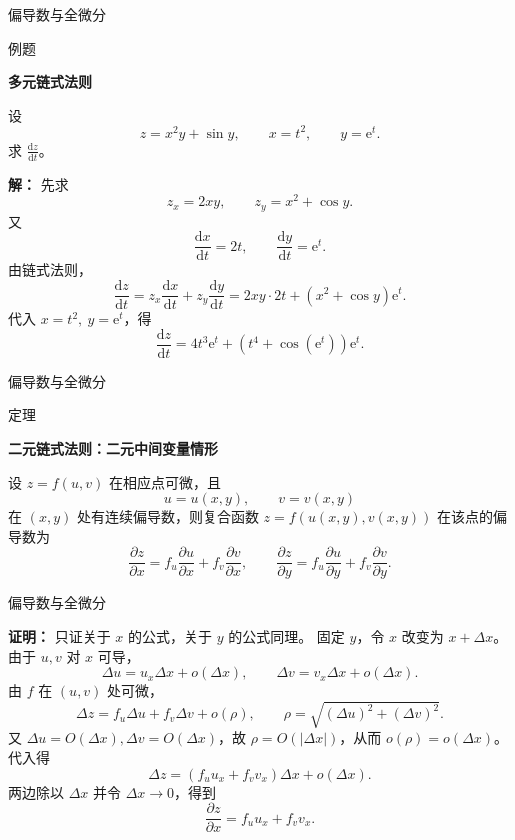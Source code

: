 \documentclass[aspectratio=169,10pt,fontset=fandol]{ctexbeamer}
\newcommand{\dd}{\mathrm{d}}
\newcommand{\ee}{\mathrm{e}}
\begin{document}
\begin{frame}[t,fragile]{偏导数与全微分}
\small
\begin{block}{例题}
{\small
\textbf{多元链式法则}\par

设
\[
z=x^2y+\sin y,\qquad x=t^2,\qquad y=\ee^t.
\]
求 $\frac{\dd z}{\dd t}$。

}
\end{block}
\pause
{\small
\textbf{解：}
先求
\[
z_x=2xy,\qquad z_y=x^2+\cos y.
\]
又
\[
\frac{\dd x}{\dd t}=2t,\qquad \frac{\dd y}{\dd t}=\ee^t.
\]
由链式法则，
\[
\frac{\dd z}{\dd t}
=z_x\frac{\dd x}{\dd t}+z_y\frac{\dd y}{\dd t}
=2xy\cdot2t+(x^2+\cos y)\ee^t.
\]
代入 $x=t^2,\ y=\ee^t$，得
\[
\frac{\dd z}{\dd t}
=4t^3\ee^t+(t^4+\cos(\ee^t))\ee^t.
\]

}
\end{frame}
\begin{frame}[t,fragile]{偏导数与全微分}
\footnotesize
\begin{block}{定理}
{\footnotesize
\textbf{二元链式法则：二元中间变量情形}\par

设 $z=f(u,v)$ 在相应点可微，且
\[
u=u(x,y),\qquad v=v(x,y)
\]
在 $(x,y)$ 处有连续偏导数，则复合函数 $z=f(u(x,y),v(x,y))$ 在该点的偏导数为
\[
\frac{\partial z}{\partial x}=f_u\frac{\partial u}{\partial x}+f_v\frac{\partial v}{\partial x},
\qquad
\frac{\partial z}{\partial y}=f_u\frac{\partial u}{\partial y}+f_v\frac{\partial v}{\partial y}.
\]

}
\end{block}
\end{frame}
\begin{frame}[t,fragile]{偏导数与全微分}
\footnotesize
{\footnotesize
\textbf{证明：}
只证关于 $x$ 的公式，关于 $y$ 的公式同理。 固定 $y$，令 $x$ 改变为 $x+\Delta x$。 由于 $u,v$ 对 $x$ 可导，
\[
\Delta u=u_x\Delta x+o(\Delta x),\qquad
\Delta v=v_x\Delta x+o(\Delta x).
\]
由 $f$ 在 $(u,v)$ 处可微，
\[
\Delta z=f_u\Delta u+f_v\Delta v+o(\rho),
\qquad \rho=\sqrt{(\Delta u)^2+(\Delta v)^2}.
\]
又 $\Delta u=O(\Delta x),\Delta v=O(\Delta x)$，故 $\rho=O(|\Delta x|)$，从而 $o(\rho)=o(\Delta x)$。 代入得
\[
\Delta z=(f_u u_x+f_v v_x)\Delta x+o(\Delta x).
\]
两边除以 $\Delta x$ 并令 $\Delta x\to0$，得到
\[
\frac{\partial z}{\partial x}=f_u u_x+f_v v_x.
\]

}
\end{frame}
\end{document}
